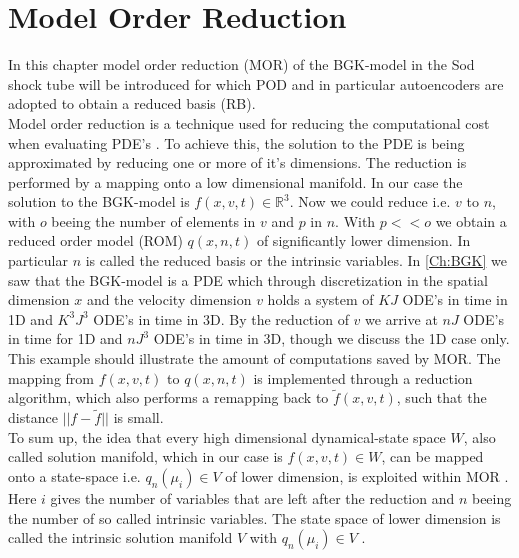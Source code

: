 
\chapter{Model Order Reduction}
\label{Ch:ROM}


In this chapter model order reduction (MOR) of the BGK-model in the Sod shock tube will be introduced for which POD and in particular autoencoders are adopted to obtain a reduced basis (RB).\\
Model order reduction is a technique used for reducing the computational cost when evaluating PDE's \cite{Bernard}\cite{Carlberg}\cite{ohlberger2015reduced}. To achieve this, the solution to the PDE is being approximated by reducing one or more of it's dimensions. The reduction is performed by a mapping onto a low dimensional manifold. In our case the solution to the BGK-model is \(f(x,v,t) \in \mathbb{R}^3\). Now we could reduce i.e. \(v\) to \(n\), with \(o\) beeing the number of elements in \(v\) and \(p\) in \(n\). With \(p << o\) we obtain a reduced order model (ROM) \(q(x,n,t)\) of significantly lower dimension. In particular \(n\) is called the reduced basis or the intrinsic variables. In \cref{Ch:BGK} we saw that the BGK-model is a PDE which through discretization in the spatial dimension \(x\) and the velocity dimension \(v\) holds a system of \(KJ\) ODE's in time in 1D and \(K^3J^3\) ODE's in time in 3D.  By the reduction of \(v\) we arrive at \(nJ\) ODE's in time for 1D and \(nJ^3\) ODE's in time in 3D, though we discuss the 1D case only. This example should illustrate the amount of computations saved by MOR. The mapping from \(f(x,v,t)\) to \(q(x,n,t)\) is implemented through a reduction algorithm, which also performs a remapping back to \(\tilde{f}(x,v,t)\), such that the distance \(||f - \tilde{f}||\) is small.\\
To sum up, the idea that every high dimensional dynamical-state space \(W\), also called solution manifold, which in our case is \(f(x,v,t) \in W\), can be mapped onto a state-space i.e. \(q_n(\mu_i) \in V\)  of lower dimension, is exploited within MOR \cite{ohlberger2015reduced}. Here \(i\) gives the number of variables that are left after the reduction and \(n\) beeing the number of so called intrinsic variables. The state space of lower dimension is called the intrinsic solution manifold \(V\) with \(q_n(\mu_i) \in V\) \cite{Carlberg}.\\
